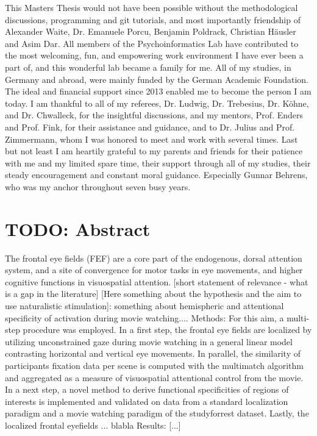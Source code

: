 \documentclass[a4paper, 12pt]{scrreprt}
\begin{document}
{	This Masters Thesis would not have been possible without the methodological discussions, programming and git tutorials, and most importantly friendship of Alexander Waite, Dr. Emanuele Porcu, Benjamin Poldrack, Christian Häusler and Asim Dar. All members of the Psychoinformatics Lab have contributed to the most welcoming, fun, and empowering work environment I have ever been a part of, and this wonderful lab became a family for me. \newline
	All of my studies, in Germany and abroad, were mainly funded by the German Academic Foundation. The ideal and financial support since 2013 enabled me to become the person I am today. I am thankful to all of my referees, Dr. Ludwig, Dr. Trebesius, Dr. Köhne, and Dr. Chwalleck, for the insightful discussions, and my mentors, Prof. Enders and Prof. Fink, for their assistance and guidance, and to Dr. Julius and Prof. Zimmermann, whom I was honored to meet and work with several times. \newline
	Last but not least I am heartily grateful to my parents and friends for their patience with me and my limited spare time, their support through all of my studies, their steady encouragement and constant moral guidance. Especially Gunnar Behrens, who was my anchor throughout seven busy years. 
}




\clearpage

\setcounter{page}{1}	%


\chapter*{TODO: Abstract}

The frontal eye fields (FEF) are a core part of the endogenous, dorsal attention system, and a site of convergence for motor tasks in eye movements, and higher cognitive functions in visuospatial attention. [short statement of relevance - what is a gap in the literature]  [Here something about the hypothesis and the aim to use naturalistic stimulation]: something about hemispheric and attentional specificity of activation during movie watching.... \newline
Methods:
For this aim, a multi-step procedure was employed. In a first step, the frontal eye fields are localized by utilizing unconstrained gaze during movie watching in a general linear model contrasting horizontal and vertical eye movements. In parallel, the similarity of participants fixation data per scene is computed with the multimatch algorithm and aggregated as a measure of visuospatial attentional control from the movie. In a next step, a novel method to derive functional specificities of regions of interests is implemented and validated on data from a standard localization paradigm and a movie watching paradigm of the studyforrest dataset. Lastly, the localized frontal eyefields ... blabla \newline
Results: [...]
\end{document}
